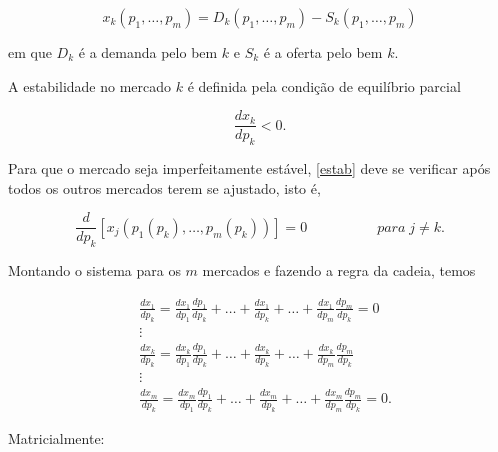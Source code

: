 \documentclass[
	12pt,				%
	openright,			%
	twoside,			%
	a4paper,			%
	english,			%
	french,				%
	spanish,			%
	brazil				%
	]{abntex2}
\newcommand{\espaco}{\hspace{5em}}
\newcommand{\precos}{p_1, \ldots, p_m}
\begin{document}
\begin{equation}
	x_k(\precos) = D_k(\precos) - S_k(\precos)
\end{equation}

em que $D_k$ é a demanda pelo bem $k$ e $S_k$ é a oferta pelo bem $k$.

A estabilidade no mercado $k$ é definida pela condição de equilíbrio parcial

\begin{equation} \label{estab}
	\frac{dx_k}{dp_k} < 0.
\end{equation}

Para que o mercado seja imperfeitamente estável, \ref{estab} deve se verificar
após todos os outros mercados terem se ajustado, isto é,

\begin{equation}
	\frac{d}{dp_k}[x_j(p_1(p_k), \ldots, p_m(p_k))] = 0 \espaco para \; j \neq k.
\end{equation}

Montando o sistema para os $m$ mercados e fazendo a regra da cadeia, temos

\begin{equation} \label{sistimperf}
	\begin{aligned}
		& \frac{dx_1}{dp_k} = \frac{dx_1}{dp_1}\frac{dp_1}{dp_k} + \ldots + \frac{dx_1}{dp_k} + \ldots + \frac{dx_1}{dp_m}\frac{dp_m}{dp_k} = 0 \\
		& \vdots \\
		& \frac{dx_k}{dp_k} = \frac{dx_k}{dp_1}\frac{dp_1}{dp_k} + \ldots + \frac{dx_k}{dp_k} + \ldots + \frac{dx_k}{dp_m}\frac{dp_m}{dp_k}     \\
    & \vdots \\
	  & \frac{dx_m}{dp_k} = \frac{dx_m}{dp_1}\frac{dp_1}{dp_k} + \ldots + \frac{dx_m}{dp_k} + \ldots + \frac{dx_m}{dp_m}\frac{dp_m}{dp_k} = 0.
	\end{aligned}
\end{equation}

Matricialmente:
\end{document}
